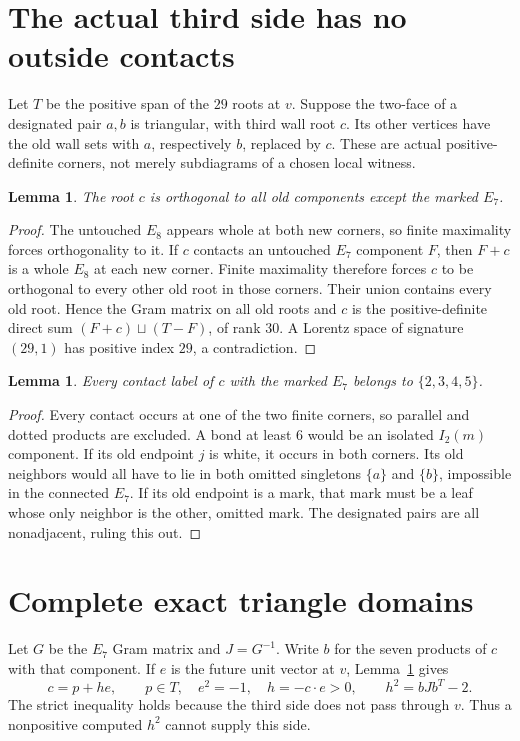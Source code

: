 \documentclass[11pt]{article}
\newtheorem{lemma}[theorem]{Lemma}
\begin{document}
\section{The actual third side has no outside contacts}
Let $T$ be the positive span of the $29$ roots at $v$. Suppose the two-face
of a designated pair $a,b$ is triangular, with third wall root $c$.
Its other vertices have the old wall sets with $a$, respectively $b$,
replaced by $c$. These are actual positive-definite corners, not merely
subdiagrams of a chosen local witness.

\begin{lemma}\label{lem:outside}
The root $c$ is orthogonal to all old components except the marked $E_7$.
\end{lemma}
\begin{proof}
The untouched $E_8$ appears whole at both new corners, so finite maximality
forces orthogonality to it. If $c$ contacts an untouched $E_7$ component
$F$, then $F+c$ is a whole $E_8$ at each new corner. Finite maximality
therefore forces $c$ to be orthogonal to every other old root in those
corners. Their union contains every old root. Hence the Gram matrix on
all old roots and $c$ is the positive-definite direct sum
$(F+c)\sqcup(T-F)$, of rank $30$. A Lorentz space of signature $(29,1)$
has positive index $29$, a contradiction.
\end{proof}

\begin{lemma}\label{lem:labels}
Every contact label of $c$ with the marked $E_7$ belongs to
$\{2,3,4,5\}$.
\end{lemma}
\begin{proof}
Every contact occurs at one of the two finite corners, so parallel and
dotted products are excluded. A bond at least $6$ would be an isolated
$I_2(m)$ component. If its old endpoint $j$ is white, it occurs in both
corners. Its old neighbors would all have to lie in both omitted
singletons $\{a\}$ and $\{b\}$, impossible in the connected $E_7$.
If its old endpoint is a mark, that mark must be a leaf whose only
neighbor is the other, omitted mark. The designated pairs are all
nonadjacent, ruling this out.
\end{proof}

\section{Complete exact triangle domains}
Let $G$ be the $E_7$ Gram matrix and $J=G^{-1}$. Write $b$ for the seven
products of $c$ with that component. If $e$ is the future unit vector
at $v$, Lemma~\ref{lem:outside} gives
\[
c=p+h e,\qquad p\in T,\quad e^2=-1,\quad
h=-c\cdot e>0,\qquad h^2=bJb^T-2.
\]
The strict inequality holds because the third side does not pass through
$v$. Thus a nonpositive computed $h^2$ cannot supply this side.
\end{document}

